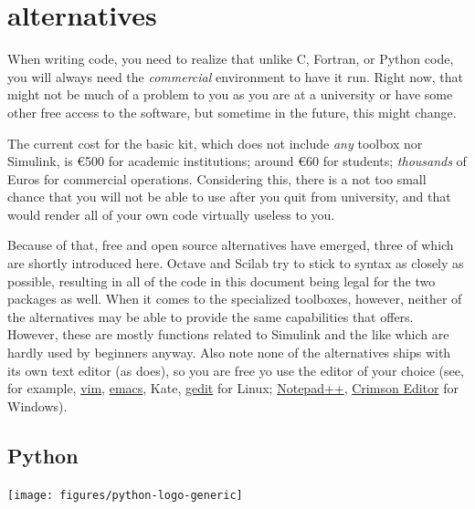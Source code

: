 \newpage
\section*{\matlab{} alternatives}

When writing \matlab{} code, you need to realize that unlike C, Fortran, or
Python code, you will always need the \emph{commercial} \matlab{} environment
to have it run. Right now, that might not be much of a problem to you as you
are at a university or have some other free access to the software, but
sometime in the future, this might change.

The current cost for the basic \matlab{} kit, which does not include
\emph{any} toolbox nor Simulink, is €500 for academic institutions;
around €60 for students; \emph{thousands} of Euros for commercial
operations. Considering this, there is a not too small chance that you will
not be able to use \matlab{} after you quit from university, and that would
render all of your own code virtually useless to you.

Because of that, free and open source \matlab{} alternatives have emerged,
three of which are shortly introduced here. Octave and Scilab try to stick to
\matlab{} syntax as closely as possible, resulting in all of the code in this
document being legal for the two packages as well.  When it comes to the
specialized toolboxes, however, neither of the alternatives may be able to
provide the same capabilities that \matlab{} offers. However, these are mostly
functions related to Simulink and the like which are hardly used by beginners
anyway.  Also note none of the alternatives ships with its own text editor (as
\matlab{} does), so you are free yo use the editor of your choice (see, for
example, \href{http://www.vim.org/}{vim},
\href{http://www.gnu.org/software/emacs/}{emacs}, Kate,
\href{http://projects.gnome.org/gedit/}{gedit} for Linux;
\href{http://notepad-plus.sourceforge.net/uk/site.htm}{Notepad++},
\href{http://www.crimsoneditor.com/}{Crimson Editor} for Windows).

\subsection{Python}

\begin{floatingfigure}[r]{6cm}
\centering
\texttt{[image: figures/python-logo-generic]}
\end{floatingfigure}

